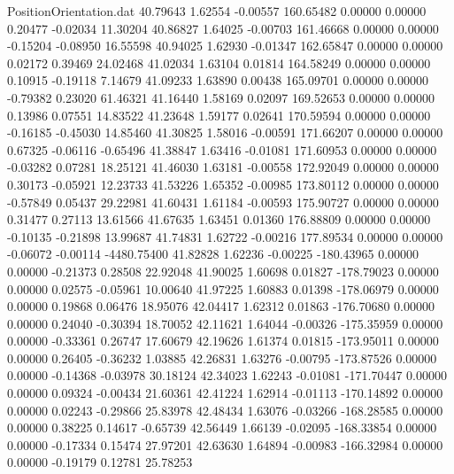 \begin{filecontents}{PositionOrientation.dat}
  40.79643    1.62554   -0.00557   160.65482    0.00000    0.00000    0.20477   -0.02034   11.30204
  40.86827    1.64025   -0.00703   161.46668    0.00000    0.00000   -0.15204   -0.08950   16.55598
  40.94025    1.62930   -0.01347   162.65847    0.00000    0.00000    0.02172    0.39469   24.02468
  41.02034    1.63104    0.01814   164.58249    0.00000    0.00000    0.10915   -0.19118    7.14679
  41.09233    1.63890    0.00438   165.09701    0.00000    0.00000   -0.79382    0.23020   61.46321
  41.16440    1.58169    0.02097   169.52653    0.00000    0.00000    0.13986    0.07551   14.83522
  41.23648    1.59177    0.02641   170.59594    0.00000    0.00000   -0.16185   -0.45030   14.85460
  41.30825    1.58016   -0.00591   171.66207    0.00000    0.00000    0.67325   -0.06116   -0.65496
  41.38847    1.63416   -0.01081   171.60953    0.00000    0.00000   -0.03282    0.07281   18.25121
  41.46030    1.63181   -0.00558   172.92049    0.00000    0.00000    0.30173   -0.05921   12.23733
  41.53226    1.65352   -0.00985   173.80112    0.00000    0.00000   -0.57849    0.05437   29.22981
  41.60431    1.61184   -0.00593   175.90727    0.00000    0.00000    0.31477    0.27113   13.61566
  41.67635    1.63451    0.01360   176.88809    0.00000    0.00000   -0.10135   -0.21898   13.99687
  41.74831    1.62722   -0.00216   177.89534    0.00000    0.00000   -0.06072   -0.00114 -4480.75400
  41.82828    1.62236   -0.00225  -180.43965    0.00000    0.00000   -0.21373    0.28508   22.92048
  41.90025    1.60698    0.01827  -178.79023    0.00000    0.00000    0.02575   -0.05961   10.00640
  41.97225    1.60883    0.01398  -178.06979    0.00000    0.00000    0.19868    0.06476   18.95076
  42.04417    1.62312    0.01863  -176.70680    0.00000    0.00000    0.24040   -0.30394   18.70052
  42.11621    1.64044   -0.00326  -175.35959    0.00000    0.00000   -0.33361    0.26747   17.60679
  42.19626    1.61374    0.01815  -173.95011    0.00000    0.00000    0.26405   -0.36232    1.03885
  42.26831    1.63276   -0.00795  -173.87526    0.00000    0.00000   -0.14368   -0.03978   30.18124
  42.34023    1.62243   -0.01081  -171.70447    0.00000    0.00000    0.09324   -0.00434   21.60361
  42.41224    1.62914   -0.01113  -170.14892    0.00000    0.00000    0.02243   -0.29866   25.83978
  42.48434    1.63076   -0.03266  -168.28585    0.00000    0.00000    0.38225    0.14617   -0.65739
  42.56449    1.66139   -0.02095  -168.33854    0.00000    0.00000   -0.17334    0.15474   27.97201
  42.63630    1.64894   -0.00983  -166.32984    0.00000    0.00000   -0.19179    0.12781   25.78253

\end{filecontents}
